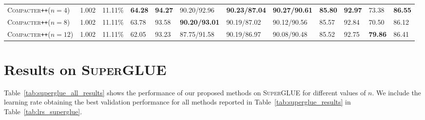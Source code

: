 \documentclass{article}
\newcommand{\compacter}{\textsc{Compacter}\xspace}
\newcommand{\compacteronlyff}{\textsc{Compacter}\texttt{++}\xspace} %
\newcommand{\superglue}{\textsc{SuperGLUE}\xspace}
\begin{document}
\begin{table}[H]
\begin{adjustbox}{max width=\textwidth}
\begin{tabular}{l@{\hskip 0.02in}|l@{\hskip 0.06in}l@{\hskip 0.0in}|l@{\hskip 0.08in}l@{\hskip 0.08in}l@{\hskip 0.08in}l@{\hskip 0.08in}l@{\hskip 0.08in}l@{\hskip 0.08in}l@{\hskip 0.08in}l|l}
\midrule 
\compacteronlyff ($n=4$)& 1.002&11.11\% & \textbf{64.28} &  \textbf{94.27} &   90.20/92.96 &  \textbf{90.23/87.04} &  \textbf{90.27/90.61} &  \textbf{85.80} &  \textbf{92.97} &  73.38 &  \textbf{86.55}  \\%
\compacteronlyff ($n=8$)& 1.002 &11.11\% & 63.78 &  93.58 &   \textbf{90.20/93.01} &  90.19/87.02 &  90.12/90.56 &  85.57 &  92.84 &  70.50 &  86.12\\%
\compacteronlyff ($n=12$)& 1.002 & 11.11\% &  62.05 &  93.23 &  87.75/91.58 &  90.19/86.97 &  90.08/90.48 &  85.52 &  92.75 &  \textbf{79.86} &  86.41 \\ %
\bottomrule
\end{tabular}
\end{adjustbox}
\label{tab:glue_results_with_lm_head} 
\end{table} 



     
\section{Results on \superglue} \label{app:superglue}
Table~\ref{tab:superglue_all_results} shows the performance of our proposed methods on \superglue for different values of $n$. We include the learning rate obtaining the best validation performance for all methods reported in Table~\ref{tab:superglue_results} in Table~\ref{tab:lrs_superglue}.
\end{document}
